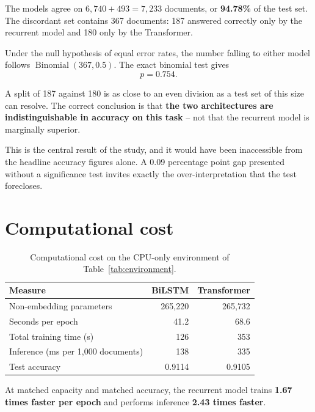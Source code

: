 The models agree on $6{,}740 + 493 = 7{,}233$ documents, or \textbf{94.78\%} of the test set. The
discordant set contains 367 documents: 187 answered correctly only by the recurrent model and 180
only by the Transformer.

Under the null hypothesis of equal error rates, the number falling to either model follows
$\operatorname{Binomial}(367, 0.5)$. The exact binomial test gives
\begin{equation}
p = 0.754 .
\end{equation}

 A split of 187
against 180 is as close to an even division as a test set of this size can resolve. The correct
conclusion is that \textbf{the two architectures are indistinguishable in accuracy on this task} --
not that the recurrent model is marginally superior.

This is the central result of the study, and it would have been inaccessible from the headline
accuracy figures alone. A 0.09 percentage point gap presented without a significance test invites
exactly the over-interpretation that the test forecloses.

\section{Computational cost}
\label{sec:cost}

\begin{table}[ht]
\centering
\caption[Computational cost]{Computational cost on the CPU-only environment of
Table~\ref{tab:environment}.}
\label{tab:cost}
\begin{tabular}{lrr}
\toprule
\textbf{Measure} & \textbf{BiLSTM} & \textbf{Transformer} \\
\midrule
Non-embedding parameters  & 265{,}220 & 265{,}732 \\
Seconds per epoch         & 41.2 & 68.6 \\
Total training time (s)   & 126  & 353 \\
Inference (ms per 1{,}000 documents) & 138 & 335 \\
Test accuracy             & 0.9114 & 0.9105 \\
\bottomrule
\end{tabular}
\end{table}

At matched capacity and matched accuracy, the recurrent model trains \textbf{1.67 times faster per
epoch} and performs inference \textbf{2.43 times faster}.

